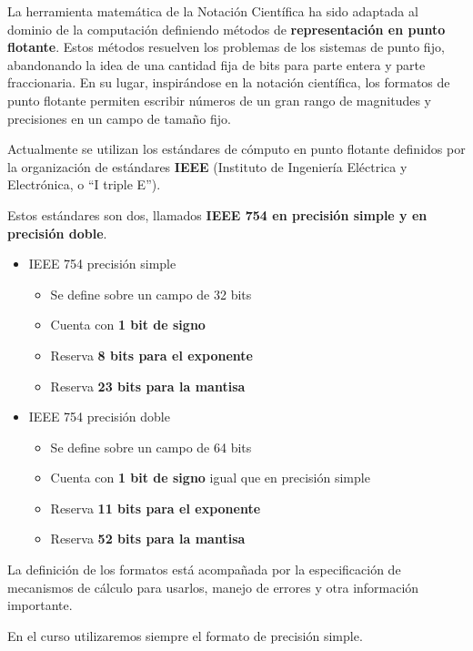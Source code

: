 \documentclass[spanish,A4,]{article}
\begin{document}
La herramienta matemática de la Notación Científica ha sido adaptada al
dominio de la computación definiendo métodos de \textbf{representación
en punto flotante}. Estos métodos resuelven los problemas de los
sistemas de punto fijo, abandonando la idea de una cantidad fija de bits
para parte entera y parte fraccionaria. En su lugar, inspirándose en la
notación científica, los formatos de punto flotante permiten escribir
números de un gran rango de magnitudes y precisiones en un campo de
tamaño fijo.

Actualmente se utilizan los estándares de cómputo en punto flotante
definidos por la organización de estándares \textbf{IEEE} (Instituto de
Ingeniería Eléctrica y Electrónica, o ``I triple E'').

Estos estándares son dos, llamados \textbf{IEEE 754 en precisión simple
y en precisión doble}.

\begin{itemize}
\itemsep1pt\parskip0pt
\item
  IEEE 754 precisión simple

  \begin{itemize}
  \itemsep1pt\parskip0pt
  \item
    Se define sobre un campo de 32 bits
  \item
    Cuenta con \textbf{1 bit de signo}
  \item
    Reserva \textbf{8 bits para el exponente}
  \item
    Reserva \textbf{23 bits para la mantisa}
  \end{itemize}
\item
  IEEE 754 precisión doble

  \begin{itemize}
  \itemsep1pt\parskip0pt
  \item
    Se define sobre un campo de 64 bits
  \item
    Cuenta con \textbf{1 bit de signo} igual que en precisión simple
  \item
    Reserva \textbf{11 bits para el exponente}
  \item
    Reserva \textbf{52 bits para la mantisa}
  \end{itemize}
\end{itemize}

La definición de los formatos está acompañada por la especificación de
mecanismos de cálculo para usarlos, manejo de errores y otra información
importante.

En el curso utilizaremos siempre el formato de precisión simple.
\end{document}
